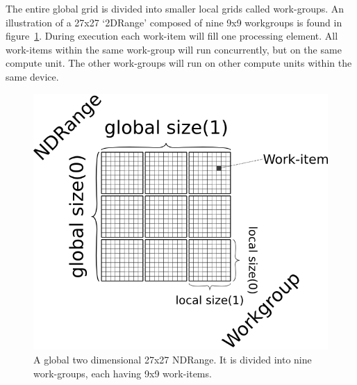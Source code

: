The entire global grid is divided into smaller local grids called work-groups.
An illustration of a 27x27 `2DRange' composed of nine 9x9 workgroups is found in figure~\ref{fig:OpenCL:ndrange}.
During execution each work-item will fill one processing element.
All work-items within the same work-group will run concurrently, but on the same compute unit. The other work-groups will run on other compute units within the same device.

\begin{figure}
\begin{center}
\includegraphics[scale=0.5]{../08-OpenCL/figs/NDRange.png}
\caption{A global two dimensional 27x27 NDRange. It is divided into nine work-groups, each having 9x9 work-items.}
\label{fig:OpenCL:ndrange}
\end{center}
\end{figure}



